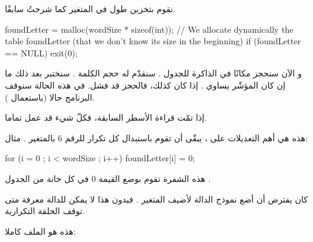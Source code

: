 نقوم بتخزين طول
في المتغير
كما شرحتُ سابقًا.

\begin{Csource}
foundLetter = malloc(wordSize  * sizeof(int)); // We allocate dynamically the table foundLetter (that we don't know its size in the beginning)
if (foundLetter  == NULL)
	 exit(0);
\end{Csource}

و الآن سنحجز مكانًا في الذاكرة للجدول
.
سنقدّم له حجم الكلمة
.
سنختبر بعد ذلك ما إن كان المؤشّر يساوي
.
إذا كان كذلك، فالحجز قد فشل. في هذه الحالة سنوقف البرنامج حالا (باستعمال
).

إذا تمّت قراءة الأسطر السابقة، فكلّ شيء قد عمل تماما.

هذه هي أهم التعديلات على ،
يبقّى أن تقوم باستبدال كل تكرار للرقم 6 بالمتغير
.
مثال:

\begin{Csource}
for (i = 0 ; i < wordSize ; i++)
 	foundLetter[i] = 0;
\end{Csource}

هذه الشفرة تقوم بوضع القيمة 0 في كل خانة من الجدول
.

كان يفترض أن أضع نموذج الدالة
لأضيف المتغير
.
فبدون هذا لا يمكن للدالة معرفة متى توقف الحلقة التكرارية.

هذه هو الملف
كاملا:

